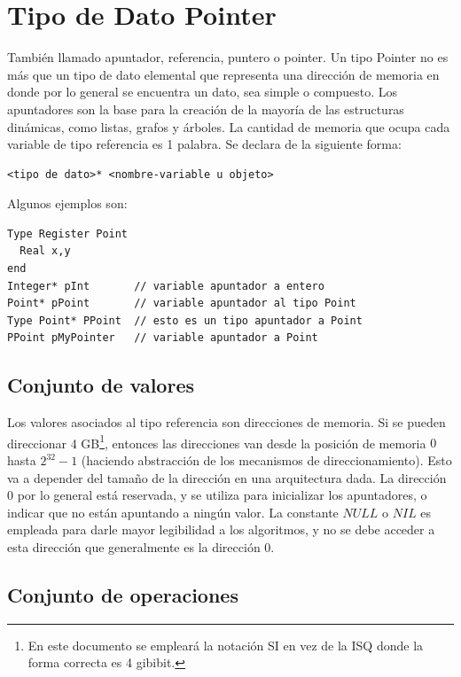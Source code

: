 \section{Tipo de Dato Pointer} \label{lb:pointer}

También llamado apuntador, referencia, puntero o pointer. Un tipo Pointer no es más que un tipo de dato elemental que representa una dirección de memoria en donde por lo general se encuentra un dato, sea simple o compuesto. Los apuntadores son la base para la creación de la mayoría de las estructuras dinámicas, como listas, grafos y árboles. La cantidad de memoria que ocupa cada variable de tipo referencia es 1 palabra. Se declara de la siguiente forma:

\begin{lstlisting}[upquote=true, language=pseudo]
<tipo de dato>* <nombre-variable u objeto>
\end{lstlisting}

Algunos ejemplos son:

\begin{lstlisting}[upquote=true, language=pseudo]
Type Register Point
  Real x,y
end
Integer* pInt		// variable apuntador a entero
Point* pPoint		// variable apuntador al tipo Point
Type Point* PPoint	// esto es un tipo apuntador a Point
PPoint pMyPointer	// variable apuntador a Point
\end{lstlisting}

\subsection{Conjunto de valores}

Los valores asociados al tipo referencia son direcciones de memoria. Si se pueden direccionar 4 GB\footnote{En este documento se empleará la notación SI en vez de la ISQ donde la forma correcta es 4 gibibit.}, entonces las direcciones van desde la posición de memoria $0$ hasta $2^{32}-1$ (haciendo abstracción de los mecanismos de direccionamiento). Esto va a depender del tamaño de la dirección en una arquitectura dada. La dirección 0 por lo general está reservada, y se utiliza para inicializar los apuntadores, o indicar que no están apuntando a ningún valor. La constante $NULL$ o $NIL$ es empleada para darle mayor legibilidad a los algoritmos, y no se debe acceder a esta dirección que generalmente es la dirección $0$.

\subsection{Conjunto de operaciones}

